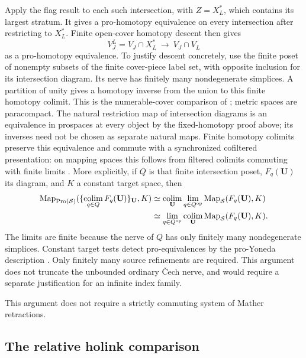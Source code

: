 \documentclass[11pt,a4paper]{article}
\theoremstyle{definition}
\begin{document}
Apply the flag result to each such intersection, with \(Z=X_L^*\), which contains its largest stratum. It gives a pro-homotopy equivalence on every intersection after restricting to \(X_L^*\). Finite open-cover homotopy descent then gives \[
 V_J^L=V_J\cap X_L^*\ \longrightarrow\ V_J\cap V_L
\] as a pro-homotopy equivalence. To justify descent concretely, use the finite poset of nonempty subsets of the finite cover-piece label set, with opposite inclusion for its intersection diagram. Its nerve has finitely many nondegenerate simplices. A partition of unity gives a homotopy inverse from the union to this finite homotopy colimit. This is the numerable-cover comparison of \cite[Proposition~4G.2, p.~459]{HatcherCover}; metric spaces are paracompact. The natural restriction map of intersection diagrams is an equivalence in prospaces at every object by the fixed-homotopy proof above; its inverses need not be chosen as separate natural maps. Finite homotopy colimits preserve this equivalence and commute with a synchronized cofiltered presentation: on mapping spaces this follows from filtered colimits commuting with finite limits \cite[Theorem~9.1.5.1]{KerodonFiltered}. More explicitly, if $Q$ is that finite intersection poset, $F_q(\mathbf U)$ its diagram, and $K$ a constant target space, then
\[
\begin{aligned}
 \operatorname{Map}_{\operatorname{Pro}(\mathcal S)}
  (\{\operatorname*{colim}_{q\in Q}F_q(\mathbf U)\}_{\mathbf U},K)
 &\simeq\operatorname*{colim}_{\mathbf U}
    \lim_{q\in Q^{\rm op}}
       \operatorname{Map}_{\mathcal S}(F_q(\mathbf U),K)\\
 &\simeq\lim_{q\in Q^{\rm op}}
    \operatorname*{colim}_{\mathbf U}
       \operatorname{Map}_{\mathcal S}(F_q(\mathbf U),K).
\end{aligned}
\]
The limits are finite because the nerve of $Q$ has only finitely many nondegenerate simplices. Constant target tests detect pro-equivalences by the pro-Yoneda description \cite[Section~3.2]{BHH}. Only finitely many source refinements are required. This argument does not truncate the unbounded ordinary \v{C}ech nerve, and would require a separate justification for an infinite index family.

This argument does not require a strictly commuting system of Mather retractions. 

\subsection{The relative holink comparison}\label{c4.02-proved-the-relative-holink-comparison}
\end{document}
